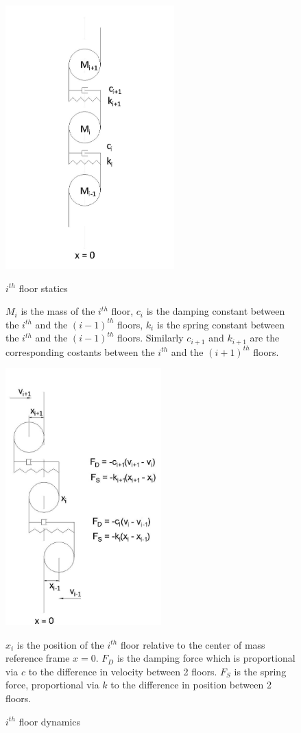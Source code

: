 \documentclass{article}
\begin{document}
				\begin{figure}[h!]
  					\centering
 				 	\begin{minipage}[b]{0.4\textwidth}
    						\includegraphics[width=65mm]{SPRINGS-Model2A.jpg}
    						\caption{$i^{th}$ floor statics}
						\medskip
						\small
						$M_i$ is the mass of the $i^{th}$ floor, $c_i$ is the damping constant between the $i^{th}$ and the $(i-1)^{th}$ floors, $k_i$ is the spring constant between the $i^{th}$ and the $(i-1)^{th}$ floors. Similarly $c_{i+1}$ and $k_{i+1}$ are the corresponding costants between the $i^{th}$ and the $(i+1)^{th}$ floors.
						\label{fig2}
  					\end{minipage}
 					 \hfill
					\begin{minipage}[b]{0.4\textwidth}
 				  	 	\includegraphics[width=60mm]{SPRINGS-Model3A.jpg}
    						\caption{$i^{th}$ floor dynamics}
						\medskip
					\small
					$x_i$ is the position of the $i^{th}$ floor relative to the center of mass reference frame $x = 0$. $F_D$ is the damping force which is proportional via $c$ to the difference in velocity between 2 floors. $F_S$ is the spring force, proportional via $k$ to the difference in position between 2 floors. 
						\label{fig3}
 					 \end{minipage}
				\end{figure}
\end{document}
